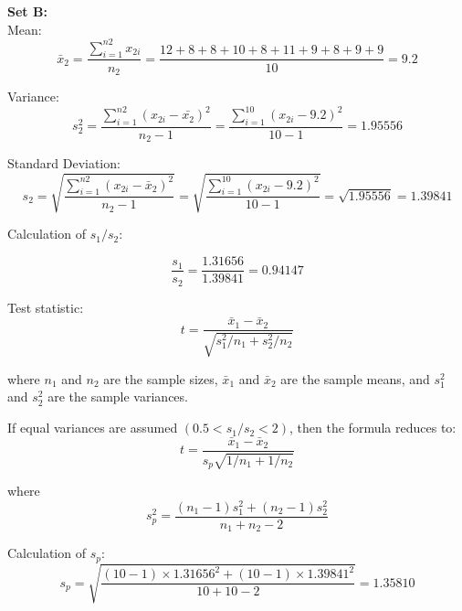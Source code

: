\documentclass[a4paper,11pt,openright]{report}
\begin{document}
\begin{enumerate}
\textbf{Set B:} \\
\hspace*{10mm} Mean:
\begin{equation*}
\bar x_{2} = \frac{\sum\limits_{i=1}^{n2} x_{2i}}{n_{2}}
	= \frac{12 + 8 + 8 + 10 + 8 + 11 + 9 + 8 + 9 + 9}{10}
	= 9.2
\end{equation*}

\hspace*{10mm} Variance:
\begin{equation*}
s_{2}^{2} = \frac{\sum\limits_{i=1}^{n2} (x_{2i} - \bar {x_{2}})^{2}}{n_{2} - 1}
= \frac{\sum\limits_{i=1}^{10} (x_{2i} - 9.2)^{2}}{10 -1} = 1.95556
\end{equation*}

\hspace*{10mm} Standard Deviation:
\begin{equation*}
s_{2} = \sqrt{\frac{\sum\limits_{i=1}^{n2} (x_{2i} - \bar x_{2})^{2}}{n_{2} - 1}}
= \sqrt{\frac{\sum\limits_{i=1}^{10} (x_{2i} - 9.2)^{2}}{10 -1}}
= \sqrt{1.95556} = 1.39841
\end{equation*}

Calculation of $s_{1}/s_{2}$:

\begin{equation*}
\frac{s_{1}}{s_{2}} = \frac{1.31656}{1.39841} = 0.94147
\end{equation*}

Test statistic: 
\begin{equation*}
t = \frac{\bar x_{1} - \bar x_{2}}{\sqrt{s_{1}^{2}/n_{1} + s_{2}^{2}/n_{2}}}
\end{equation*}

where $n_{1}$ and $n_{2}$ are the sample sizes, $\bar x_{1}$ and $\bar x_{2}$ are the sample
means, and $s_{1}^{2}$ and $s_{2}^{2}$ are the sample variances. 

If equal variances are assumed $(0.5 < s_{1}/s_{2} < 2)$, then the formula reduces to:
\begin{equation*}
t = \frac{\bar x_{1} - \bar x_{2}}{s_{p} \sqrt{1/n_{1} + 1/n_{2}}}
\end{equation*}

where
\begin{equation*}
s_{p}^{2} = \frac{(n_{1}-1)s_{1}^{2} + (n_{2}-1)s_{2}^{2}}{n_{1}+n_{2}-2}
\end{equation*}

\vspace{0.5cm}

Calculation of $s_{p}$:
\begin{equation*}
s_{p} = \sqrt{\frac{(10-1) \times 1.31656^{2} + (10-1) \times 1.39841^{2}}{10+10-2}} 
      = 1.35810
\end{equation*}


\end{enumerate}
\end{document}
